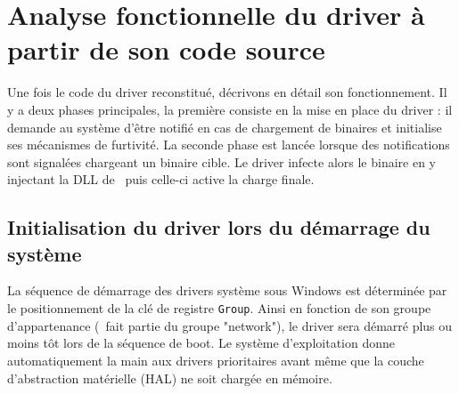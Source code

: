 \section{Analyse fonctionnelle du driver à partir de son code source}

Une fois le code du driver reconstitué, décrivons en détail son fonctionnement.
Il y a deux phases principales, la première consiste en la mise en place du driver : il demande au système d'être notifié en cas de chargement de binaires et initialise ses mécanismes de furtivité.
La seconde phase est lancée lorsque des notifications sont signalées chargeant un binaire cible. Le driver infecte alors le binaire en y injectant la DLL de \Duqu\ puis celle-ci active la charge finale.

\subsection{Initialisation du driver lors du démarrage du système}
La séquence de démarrage des drivers système sous Windows est déterminée par le positionnement de la clé de registre \texttt{Group}. Ainsi en fonction de son groupe d'appartenance (\driver\ fait partie du groupe "network"), le driver sera démarré plus ou moins tôt lors de la séquence de boot. Le système d'exploitation donne automatiquement la main aux drivers prioritaires avant même que la couche d'abstraction matérielle (HAL) ne soit chargée en mémoire. 

